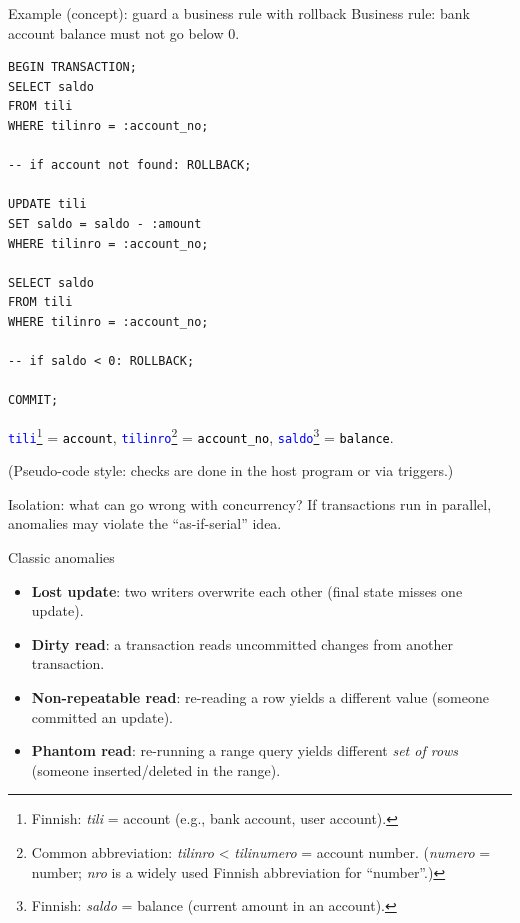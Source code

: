 \documentclass[10pt,aspectratio=169]{beamer}
\newcommand{\fin}[1]{\textcolor{blue}{\texttt{#1}}}
\newcommand{\eng}[1]{\textcolor{black}{\texttt{#1}}}
\begin{document}
\begin{frame}[fragile]{Example (concept): guard a business rule with rollback}
\small
Business rule: bank account balance must not go below 0.
\vspace{1mm}

\begin{lstlisting}[style=sqlite,basicstyle=\scriptsize\ttfamily]
BEGIN TRANSACTION;
SELECT saldo
FROM tili
WHERE tilinro = :account_no;

-- if account not found: ROLLBACK;

UPDATE tili
SET saldo = saldo - :amount
WHERE tilinro = :account_no;

SELECT saldo
FROM tili
WHERE tilinro = :account_no;

-- if saldo < 0: ROLLBACK;

COMMIT;
\end{lstlisting}

\vspace{0.3em}
\footnotesize
\fin{tili}\footnote{Finnish: \emph{tili} = account (e.g., bank account, user account).}
= \eng{account},\;
\fin{tilinro}\footnote{Common abbreviation: \emph{tilinro} < \emph{tilinumero} = account number.
(\emph{numero} = number; \emph{nro} is a widely used Finnish abbreviation for “number”.)}
= \eng{account\_no},\;
\fin{saldo}\footnote{Finnish: \emph{saldo} = balance (current amount in an account).}
= \eng{balance}.

\footnotesize (Pseudo-code style: checks are done in the host program or via triggers.)
\end{frame}

\begin{frame}{Isolation: what can go wrong with concurrency?}
\small
If transactions run in parallel, anomalies may violate the “as-if-serial” idea.

\vspace{1mm}
\begin{block}{Classic anomalies}
\begin{itemize}
  \item \textbf{Lost update}: two writers overwrite each other (final state misses one update).
  \item \textbf{Dirty read}: a transaction reads uncommitted changes from another transaction.
  \item \textbf{Non-repeatable read}: re-reading a row yields a different value (someone committed an update).
  \item \textbf{Phantom read}: re-running a range query yields different \emph{set of rows} (someone inserted/deleted in the range).
\end{itemize}
\end{block}
\end{frame}
\end{document}
